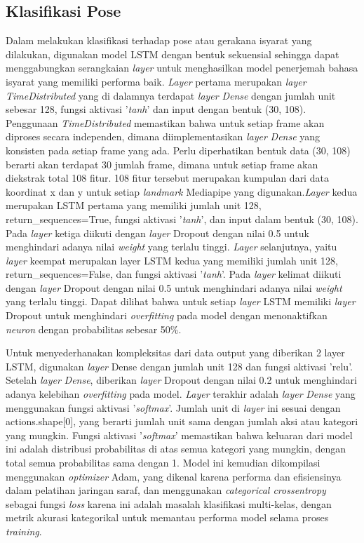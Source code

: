 \subsection{Klasifikasi Pose}
\label{sec:metodologipose}

Dalam melakukan klasifikasi terhadap pose atau gerakana isyarat yang dilakukan, digunakan model LSTM dengan bentuk sekuensial sehingga dapat menggabungkan serangkaian \emph{layer} untuk menghasilkan model penerjemah bahasa isyarat yang memiliki performa baik. \emph{Layer} pertama merupakan \emph{layer} \textit{TimeDistributed} yang di dalamnya terdapat \emph{layer} \textit{Dense} dengan jumlah unit sebesar 128, fungsi aktivasi '\textit{tanh}' dan input dengan bentuk (30, 108). Penggunaan \textit{TimeDistributed} memastikan bahwa untuk setiap frame akan diproses secara independen, dimana diimplementasikan \emph{layer} \textit{Dense} yang konsisten pada setiap frame yang ada. Perlu diperhatikan bentuk data (30, 108) berarti akan terdapat 30 jumlah frame, dimana untuk setiap frame akan diekstrak total 108 fitur. 108 fitur tersebut merupakan kumpulan dari data koordinat x dan y untuk setiap \emph{landmark} Mediapipe yang digunakan.\emph{Layer} kedua merupakan LSTM pertama yang memiliki jumlah unit 128, return\_sequences=True, fungsi aktivasi '\textit{tanh}', dan input dalam bentuk (30, 108). Pada \emph{layer} ketiga diikuti dengan \emph{layer} Dropout dengan nilai 0.5 untuk menghindari adanya nilai \emph{weight} yang terlalu tinggi. \emph{Layer} selanjutnya, yaitu \emph{layer} keempat merupakan layer LSTM kedua yang memiliki jumlah unit 128, return\_sequences=False, dan fungsi aktivasi '\textit{tanh}'. Pada \emph{layer} kelimat diikuti dengan \emph{layer} Dropout dengan nilai 0.5 untuk menghindari adanya nilai \emph{weight} yang terlalu tinggi. Dapat dilihat bahwa untuk setiap \emph{layer} LSTM memiliki \emph{layer} Dropout untuk menghindari \emph{overfitting} pada model dengan menonaktifkan \emph{neuron} dengan probabilitas sebesar 50\%. 

Untuk menyederhanakan kompleksitas dari data output yang diberikan 2 layer LSTM, digunakan \emph{layer} Dense dengan jumlah unit 128 dan fungsi aktivasi 'relu'. Setelah \emph{layer} \textit{Dense}, diberikan \emph{layer} Dropout dengan nilai 0.2 untuk menghindari adanya kelebihan \emph{overfitting} pada model. \emph{Layer} terakhir adalah \emph{layer} \textit{Dense} yang menggunakan fungsi aktivasi '\textit{softmax}'. Jumlah unit di \emph{layer} ini sesuai dengan actions.shape[0], yang berarti jumlah unit sama dengan jumlah aksi atau kategori yang mungkin. Fungsi aktivasi '\textit{softmax}' memastikan bahwa keluaran dari model ini adalah distribusi probabilitas di atas semua kategori yang mungkin, dengan total semua probabilitas sama dengan 1. Model ini kemudian dikompilasi menggunakan \emph{optimizer} Adam, yang dikenal karena performa dan efisiensinya dalam pelatihan jaringan saraf, dan menggunakan \textit{categorical crossentropy} sebagai fungsi \textit{loss} karena ini adalah masalah klasifikasi multi-kelas, dengan metrik akurasi kategorikal untuk memantau performa model selama proses \textit{training}. 


